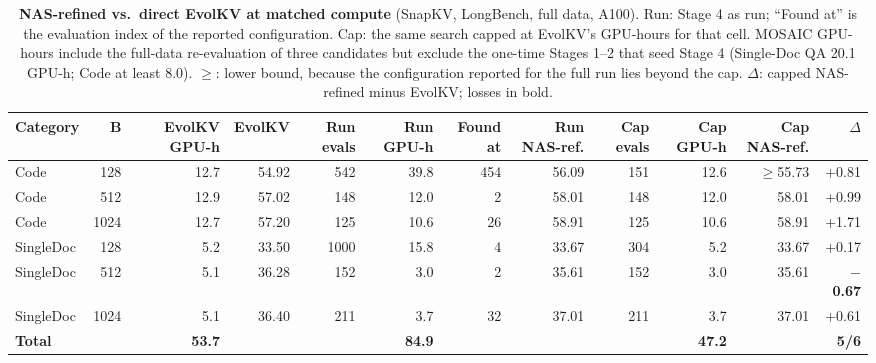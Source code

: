 \begin{table}[t]
  \centering
  \scriptsize
  \setlength{\tabcolsep}{3pt}
  \begin{tabular}{@{}l r r r r r r r r r r r@{}}
    \toprule
    Category & B & EvolKV GPU-h & EvolKV & Run evals & Run GPU-h & Found at & Run NAS-ref. & Cap evals & Cap GPU-h & Cap NAS-ref. & $\Delta$ \\
    \midrule
    Code & 128 & 12.7 & 54.92 & 542 & 39.8 & 454 & 56.09 & 151 & 12.6 & $\geq$55.73 & +0.81 \\
    Code & 512 & 12.9 & 57.02 & 148 & 12.0 & 2 & 58.01 & 148 & 12.0 & 58.01 & +0.99 \\
    Code & 1024 & 12.7 & 57.20 & 125 & 10.6 & 26 & 58.91 & 125 & 10.6 & 58.91 & +1.71 \\
    SingleDoc & 128 & 5.2 & 33.50 & 1000 & 15.8 & 4 & 33.67 & 304 & 5.2 & 33.67 & +0.17 \\
    SingleDoc & 512 & 5.1 & 36.28 & 152 & 3.0 & 2 & 35.61 & 152 & 3.0 & 35.61 & \textbf{$-$0.67} \\
    SingleDoc & 1024 & 5.1 & 36.40 & 211 & 3.7 & 32 & 37.01 & 211 & 3.7 & 37.01 & +0.61 \\
    \textbf{Total} &  & \textbf{53.7} &  &  & \textbf{84.9} &  &  &  & \textbf{47.2} &  & \textbf{5/6} \\
    \bottomrule
  \end{tabular}
  \caption{\textbf{NAS-refined vs.\ direct EvolKV at matched compute} (SnapKV, LongBench, full data, A100). Run: Stage 4 as run; ``Found at'' is the evaluation index of the reported configuration. Cap: the same search capped at EvolKV's GPU-hours for that cell. MOSAIC GPU-hours include the full-data re-evaluation of three candidates but exclude the one-time Stages 1--2 that seed Stage 4 (Single-Doc QA 20.1 GPU-h; Code at least 8.0). $\geq$: lower bound, because the configuration reported for the full run lies beyond the cap. $\Delta$: capped NAS-refined minus EvolKV; losses in bold.}
  \label{tab:app-capped}
\end{table}

